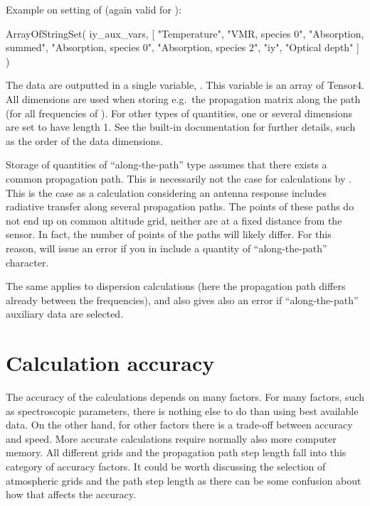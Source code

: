 Example on setting of  (again valid for
):
\begin{code}
ArrayOfStringSet( iy_aux_vars,  
    [ "Temperature", 
      "VMR, species 0",
      "Absorption, summed", 
      "Absorption, species 0",
      "Absorption, species 2",
      "iy", 
      "Optical depth" ] )
\end{code}
The data are outputted in a single variable, . This variable
is an array of Tensor4. All dimensions are used when storing e.g.\ the
propagation matrix along the path (for all frequencies of
). For other types of quantities, one or several dimensions
are set to have length 1. See the built-in documentation for further details,
such as the order of the data dimensions.

Storage of quantities of ``along-the-path'' type assumes that there exists a
common propagation path. This is necessarily not the case for calculations by
. This is the case as a calculation considering an antenna
response includes radiative transfer along several propagation paths. The
points of these paths do not end up on common altitude grid, neither are at a
fixed distance from the sensor. In fact, the number of points of the paths will
likely differ. For this reason,  will issue an error if you
in  include a quantity of ``along-the-path'' character.

The same applies to dispersion calculations (here the propagation path differs
already between the frequencies), and also  gives
also an error if ``along-the-path'' auxiliary data are selected.




\section{Calculation accuracy}
\label{sec:fm_defs:accuracy}

The accuracy of the calculations depends on many factors. For many
factors, such as spectroscopic parameters, there is nothing else to do
than using best available data. On the other hand, for other factors
there is a trade-off between accuracy and speed. More accurate
calculations require normally also more computer memory. All
different grids and the propagation path step length fall into this
category of accuracy factors. It could be worth discussing the
selection of atmospheric grids and the path step length as there can
be some confusion about how that affects the accuracy.

